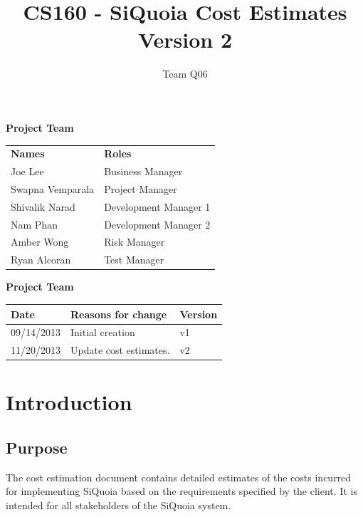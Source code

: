\documentclass[12pt]{article}
\begin{document}
\title{CS160 - SiQuoia Cost Estimates \\ {\normalsize Version 2}}

\author{{\Large Team Q06}}

\begin{titlepage}
\maketitle

{\bf Project Team}
\begin{center}
\begin{tabular}{p{4cm} l}
{\bf Names}         & {\bf Roles} \\[.5em]
Joe Lee             & Business Manager \\[1em]
Swapna Vemparala    & Project Manager \\[1em]
Shivalik Narad      & Development Manager 1 \\[1em]
Nam Phan            & Development Manager 2 \\[1em]
Amber Wong          & Risk Manager \\[1em]
Ryan Alcoran        & Test Manager
\end{tabular}
\end{center}

{\bf Project Team}
\begin{center}
\begin{tabular}{|l|l|l|}
\hline
{\bf Date}      & {\bf Reasons for change}  & {\bf Version} \\
\hline
09/14/2013      & Initial creation          & v1 \\
\hline
11/20/2013      & Update cost estimates.    & v2 \\
\hline
\end{tabular}
\end{center}

\end{titlepage}

\section{Introduction}

\subsection{Purpose}
The cost estimation document contains detailed estimates of the costs
incurred for implementing SiQuoia based on the requirements specified
by the client. It is intended for all stakeholders of the SiQuoia
system.
\end{document}
